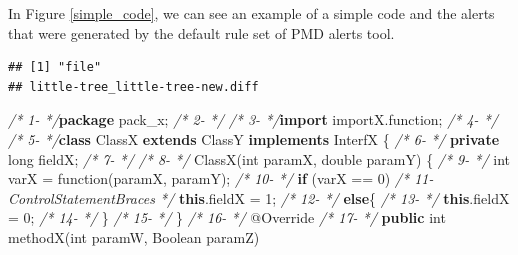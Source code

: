 \documentclass[
]{article}
\newenvironment{Shaded}{\begin{snugshade}}{\end{snugshade}}
\newcommand{\AttributeTok}[1]{\textcolor[rgb]{0.77,0.63,0.00}{#1}}
\newcommand{\BuiltInTok}[1]{#1}
\newcommand{\CommentTok}[1]{\textcolor[rgb]{0.56,0.35,0.01}{\textit{#1}}}
\newcommand{\DataTypeTok}[1]{\textcolor[rgb]{0.13,0.29,0.53}{#1}}
\newcommand{\DecValTok}[1]{\textcolor[rgb]{0.00,0.00,0.81}{#1}}
\newcommand{\FunctionTok}[1]{\textcolor[rgb]{0.00,0.00,0.00}{#1}}
\newcommand{\ImportTok}[1]{#1}
\newcommand{\KeywordTok}[1]{\textcolor[rgb]{0.13,0.29,0.53}{\textbf{#1}}}
\newcommand{\NormalTok}[1]{#1}
\begin{document}
\newpage

In Figure \ref{simple_code}, we can see an example of a simple code and
the alerts that were generated by the default rule set of PMD alerts
tool.

\small

\begin{verbatim}
## [1] "file"
## little-tree_little-tree-new.diff
\end{verbatim}

\normalsize

\small

\begin{Shaded}
\begin{Highlighting}[]
\CommentTok{/*  1-                                   */}\KeywordTok{package}\ImportTok{ pack_x;}
\CommentTok{/*  2-                                   */}  
\CommentTok{/*  3-                                   */}\KeywordTok{import}\ImportTok{ importX.function;}
\CommentTok{/*  4-                                   */}
\CommentTok{/*  5-                                   */}\KeywordTok{class}\NormalTok{ ClassX }\KeywordTok{extends}\NormalTok{ ClassY }\KeywordTok{implements}\NormalTok{ InterfX \{}
\CommentTok{/*  6-                                   */}    \KeywordTok{private} \DataTypeTok{long}\NormalTok{ fieldX;}
\CommentTok{/*  7-                                   */}    
\CommentTok{/*  8-                                   */}    \FunctionTok{ClassX}\NormalTok{(}\DataTypeTok{int}\NormalTok{ paramX, }\DataTypeTok{double}\NormalTok{ paramY) \{      }
\CommentTok{/*  9-                                   */}        \DataTypeTok{int}\NormalTok{ varX = }\FunctionTok{function}\NormalTok{(paramX, paramY);     }
\CommentTok{/* 10-                                   */}        \KeywordTok{if}\NormalTok{ (varX == }\DecValTok{0}\NormalTok{)}
\CommentTok{/* 11-ControlStatementBraces             */}            \KeywordTok{this}\NormalTok{.}\FunctionTok{fieldX}\NormalTok{ = }\DecValTok{1}\NormalTok{;}
\CommentTok{/* 12-                                   */}        \KeywordTok{else}\NormalTok{\{}
\CommentTok{/* 13-                                   */}            \KeywordTok{this}\NormalTok{.}\FunctionTok{fieldX}\NormalTok{ = }\DecValTok{0}\NormalTok{;}
\CommentTok{/* 14-                                   */}\NormalTok{     \}}
\CommentTok{/* 15-                                   */}\NormalTok{    \}}
\CommentTok{/* 16-                                   */}    \AttributeTok{@Override}
\CommentTok{/* 17-                                   */}    \KeywordTok{public} \DataTypeTok{int} \FunctionTok{methodX}\NormalTok{(}\DataTypeTok{int}\NormalTok{ paramW, }\BuiltInTok{Boolean}\NormalTok{ paramZ)}

\end{Highlighting}
\end{Shaded}
\end{document}
